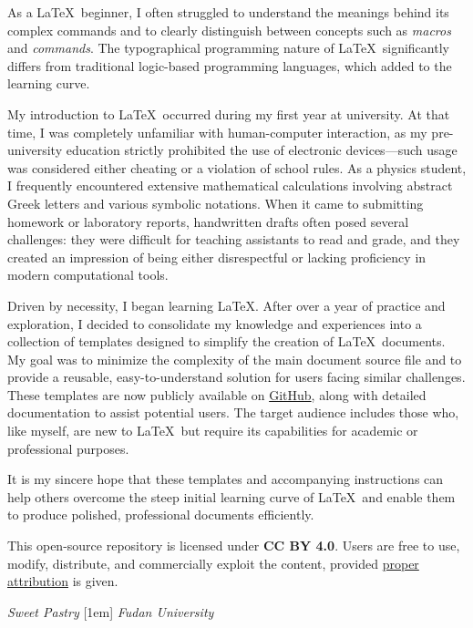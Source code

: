     As a \LaTeX\ beginner, I often struggled to understand the meanings behind its complex commands and to clearly distinguish between concepts such as \emph{macros} and \emph{commands}. The typographical programming nature of \LaTeX\ significantly differs from traditional logic-based programming languages, which added to the learning curve.

    My introduction to \LaTeX\ occurred during my first year at university. At that time, I was completely unfamiliar with human-computer interaction, as my pre-university education strictly prohibited the use of electronic devices—such usage was considered either cheating or a violation of school rules. As a physics student, I frequently encountered extensive mathematical calculations involving abstract Greek letters and various symbolic notations. When it came to submitting homework or laboratory reports, handwritten drafts often posed several challenges: they were difficult for teaching assistants to read and grade, and they created an impression of being either disrespectful or lacking proficiency in modern computational tools.

    Driven by necessity, I began learning \LaTeX. After over a year of practice and exploration, I decided to consolidate my knowledge and experiences into a collection of templates designed to simplify the creation of \LaTeX\ documents. My goal was to minimize the complexity of the main document source file and to provide a reusable, easy-to-understand solution for users facing similar challenges. These templates are now publicly available on \href{https://github.com/SweetPastry/spTemplate?tab=CC-BY-4.0-1-ov-file}{GitHub}, along with detailed documentation to assist potential users. The target audience includes those who, like myself, are new to \LaTeX\ but require its capabilities for academic or professional purposes.

    It is my sincere hope that these templates and accompanying instructions can help others overcome the steep initial learning curve of \LaTeX\ and enable them to produce polished, professional documents efficiently.
    
    This open-source repository is licensed under \textbf{CC BY 4.0}. Users are free to use, modify, distribute, and commercially exploit the content, provided \href{https://github.com/SweetPastry/spTemplate/blob/main/LICENSE}{proper attribution} is given.

    \vspace{2cm}
    \begin{flushright}
        \textit{Sweet Pastry} [1em]
        \textit{Fudan University}
    \end{flushright}